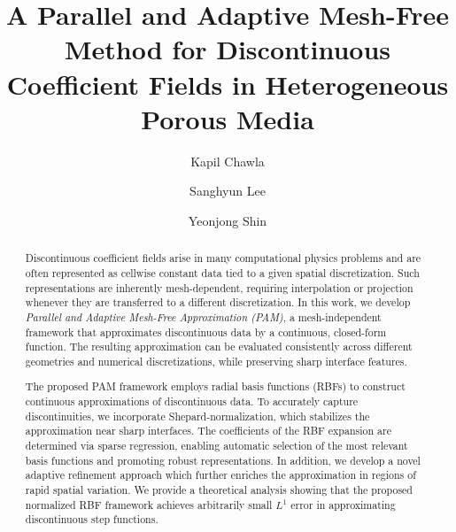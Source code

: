 \documentclass[final,1p,times]{elsarticle}
\theoremstyle{plain}
\theoremstyle{definition}
\theoremstyle{remark}
\begin{document}
\begin{frontmatter}


\title{A Parallel and Adaptive Mesh-Free Method for Discontinuous Coefficient Fields in Heterogeneous Porous Media}

\author[fsu]{Kapil Chawla}
\author[fsu]{Sanghyun Lee}
\author[ncsu]{Yeonjong Shin}






\begin{abstract}

Discontinuous coefficient fields arise in many computational physics problems and are often represented as cellwise constant data tied to a given spatial discretization. Such representations are inherently mesh-dependent, requiring interpolation or projection whenever they are transferred to a different discretization. 
In this work, we develop \emph{Parallel and Adaptive Mesh-Free Approximation (PAM)}, a mesh-independent framework that approximates discontinuous data by a continuous, closed-form function. The resulting approximation can be evaluated consistently across different geometries and numerical discretizations, while preserving sharp interface features.

The proposed PAM framework employs radial basis functions (RBFs) to construct continuous approximations of discontinuous data. To accurately capture discontinuities, we incorporate Shepard-normalization, which stabilizes the approximation near sharp interfaces. The coefficients of the RBF expansion are determined via sparse regression, enabling automatic selection of the most relevant basis functions and promoting robust representations. In addition, we develop a novel adaptive refinement approach which further enriches the approximation in regions of rapid spatial variation. We provide a theoretical analysis showing that the proposed normalized RBF framework achieves arbitrarily small $L^1$ error in approximating discontinuous step functions.


\end{abstract}
\end{frontmatter}
\end{document}
